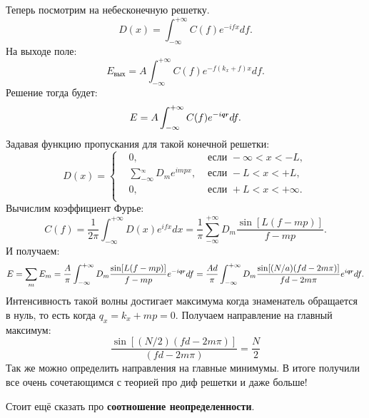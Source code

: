 Теперь посмотрим на небесконечную решетку.
\begin{equation*}
	D(x) = \int_{-\infty}^{+\infty} C(f) e^{-i f x} d f.
\end{equation*}
На выходе поле:
\begin{equation*}
	E_\text{вых} = A \int_{-\infty}^{+\infty} C(f) e^{-f(k_x +f)x}d f.
\end{equation*}
Решение тогда будет:
\begin{equation*}
	E = A \int_{-\infty}^{+\infty} C(f) e^{- i \smallvc{q} \smallvc{r}} d f.
\end{equation*}
Задавая функцию пропускания для такой конечной решетки:
\begin{equation*}
	D(x) =\left\{
	\begin{aligned}
		&0, &\text{ если } -\infty < x < - L,\\
		&\sum_{-\infty}^{_\infty} D_m e^{i m p x}, &\text{ если } - L < x < + L,\\
		&0, &\text{ если } + L < x < +\infty.\\
	\end{aligned}
	\right.
\end{equation*}
Вычислим коэффициент Фурье:
\begin{equation*}
	C(f) = \frac{1}{2 \pi} \int_{- \infty}^{+\infty} D(x) e^{i f x} dx = \frac{1}{\pi} \sum_{-\infty}^{+\infty} D_m \frac{\sin[L (f - mp)]}{f - mp}.
\end{equation*}
И получаем:
\begin{equation*}
	E = \sum_m E_m = \frac{A}{\pi} \int_{-\infty}^{+\infty} D_m \frac{\sin[L(f-mp)]}{f - mp}e^{-i \smallvc{q} \smallvc{r}} d f = \frac{A d}{\pi} \int_{-\infty}^{+\infty} D_m \frac{\sin[(N/a)(f d - 2 m \pi)]}{f d - 2m \pi}e^{i \smallvc{q} \smallvc{r}} d f.
\end{equation*}
Интенсивность такой волны достигает максимума когда знаменатель обращается в нуль, то есть когда $q_x = k_x + mp = 0$. Получаем направление на главный максимум:
\begin{equation*}
	\frac{\sin [(N/2)(fd - 2 m\pi)]}{(f d - 2 m \pi)} = \frac{N}{2}
\end{equation*}
Так же можно определить направления на главные минимумы. В итоге получили все очень сочетающимся с теорией про диф решетки и даже больше!

Стоит ещё сказать про \textbf{соотношение неопределенности}.

